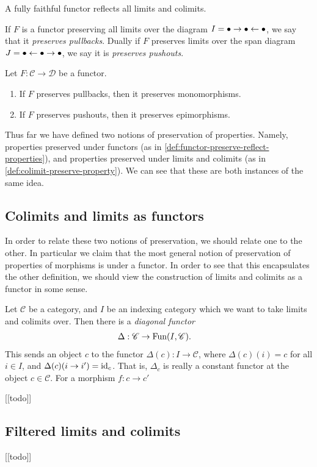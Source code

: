 \begin{proposition}\label{prop:fully-faithful-functor-reflects-limits-colimits} A fully faithful functor reflects all limits and colimits.
\end{proposition}


\begin{remark}\label{rmk:labelname} If $F$ is a functor preserving all limits over the diagram $I = \bullet \to \bullet \leftarrow \bullet$, we say that it \textit{preserves pullbacks}. Dually if $F$ preserves limits over the span diagram $J = \bullet \leftarrow \bullet \to \bullet$, we say it is \textit{preserves pushouts}.
\end{remark}

\begin{exercise}\label{exer:pullback-preserving-functor-preserves-monos} Let $F: \mathscr{C}\to \mathscr{D}$ be a functor.
\begin{enumerate}
    \item If $F$ preserves pullbacks, then it preserves monomorphisms.
    \item If $F$ preserves pushouts, then it preserves epimorphisms.
\end{enumerate}
\end{exercise}

Thus far we have defined two notions of preservation of properties. Namely, properties preserved under functors (as in \autoref{def:functor-preserve-reflect-properties}), and properties preserved under limits and colimits (as in \autoref{def:colimit-preserve-property}). We can see that these are both instances of the same idea.

\subsection{Colimits and limits as functors}

In order to relate these two notions of preservation, we should relate one to the other. In particular we claim that the most general notion of preservation of properties of morphisms is under a functor. In order to see that this encapsulates the other definition, we should view the construction of limits and colimits as a functor in some sense.

Let $\mathscr{C}$ be a category, and $I$ be an indexing category which we want to take limits and colimits over. Then there is a \textit{diagonal functor}
\begin{align*}
    \Delta : \mathscr{C} &\to \text{Fun}(I, \mathscr{C}).
\end{align*}
This sends an object $c$ to the functor $\Delta(c): I \to \mathscr{C}$, where $\Delta(c)(i) = c$ for all $i\in I$, and $\Delta(c)(i \to i') = \text{id}_c$. That is, $\Delta_c$ is really a constant functor at the object $c\in \mathscr{C}$. For a morphism $f:c\to c'$

\begin{center}
    [[todo]]    
\end{center}

\subsection{Filtered limits and colimits}

\begin{center}
    [[todo]]    
\end{center}








